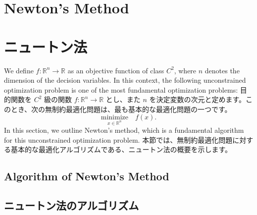 \documentclass[0_main]{subfiles}
\begin{document}
\ifEn
    \section{Newton's Method}
\else
    \section{ニュートン法}
\fi
\label{sec:background_newton}

\ifEn
    We define $f \colon \mathbb{R}^n \to \mathbb{R}$ as an objective function of class $C^2$, where $n$ denotes the dimension of the decision variables. In this context, the following unconstrained optimization problem is one of the most fundamental optimization problems:
\else
    目的関数を $C^2$ 級の関数 $f \colon \mathbb{R}^n \to \mathbb{R}$ とし、また $n$ を決定変数の次元と定めます。このとき、次の無制約最適化問題は、最も基本的な最適化問題の一つです。
\fi
\begin{equation*}
    \underset{x \in \mathbb{R}^n}{\text{minimize}} \quad f(x).
\end{equation*}
\ifEn
    In this section, we outline Newton's method, which is a fundamental algorithm for this unconstrained optimization problem.
\else
    本節では、無制約最適化問題に対する基本的な最適化アルゴリズムである、ニュートン法の概要を示します。
\fi

\ifEn
    \subsection{Algorithm of Newton's Method}
\else
    \subsection{ニュートン法のアルゴリズム}
\fi
\end{document}
